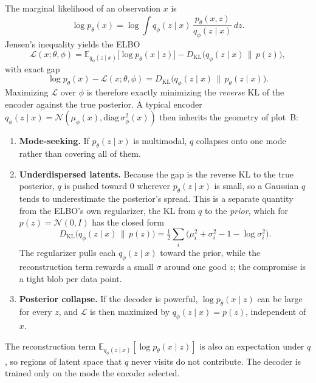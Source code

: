 \documentclass[11pt]{article}
\newcommand{\KL}{D_{\mathrm{KL}}}
\newcommand{\E}{\mathbb{E}}
\begin{document}
The marginal likelihood of an observation \(x\) is
\[
  \log p_\theta(x)
  =\log\int q_\phi(z\mid x)\,\frac{p_\theta(x,z)}{q_\phi(z\mid x)}\,dz.
\]
Jensen's inequality yields the ELBO
\begin{equation}
  \mathcal{L}(x;\theta,\phi)
  =\E_{q_\phi(z\mid x)}\bigl[\log p_\theta(x\mid z)\bigr]
  -\KL\bigl(q_\phi(z\mid x)\,\|\,p(z)\bigr),
\end{equation}
with exact gap
\begin{equation}
  \log p_\theta(x)-\mathcal{L}(x;\theta,\phi)
  =\KL\bigl(q_\phi(z\mid x)\,\|\,p_\theta(z\mid x)\bigr).
\end{equation}
Maximizing \(\mathcal{L}\) over \(\phi\) is therefore exactly minimizing
the \emph{reverse} KL of the encoder against the true posterior. A
typical encoder \(q_\phi(z\mid x)=\mathcal{N}(\mu_\phi(x),\mathrm{diag}\,\sigma_\phi^2(x))\)
then inherits the geometry of plot~B:
\begin{enumerate}
  \item \textbf{Mode-seeking.} If \(p_\theta(z\mid x)\) is multimodal,
    \(q\) collapses onto one mode rather than covering all of them.
  \item \textbf{Underdispersed latents.} Because the gap is the reverse
    KL to the true posterior, \(q\) is pushed toward \(0\) wherever
    \(p_\theta(z\mid x)\) is small, so a Gaussian \(q\) tends to
    underestimate the posterior's spread. This is a separate quantity
    from the ELBO's own regularizer, the KL from \(q\) to the
    \emph{prior}, which for \(p(z)=\mathcal{N}(0,I)\) has the closed form
    \[
      \KL\bigl(q_\phi(z\mid x)\,\|\,p(z)\bigr)
      =\tfrac12\sum_i\bigl(\mu_i^2+\sigma_i^2-1-\log\sigma_i^2\bigr).
    \]
    The regularizer pulls each \(q_\phi(z\mid x)\) toward the prior, while
    the reconstruction term rewards a small \(\sigma\) around one good
    \(z\); the compromise is a tight blob per data point.
  \item \textbf{Posterior collapse.} If the decoder is powerful,
    \(\log p_\theta(x\mid z)\) can be large for every \(z\), and
    \(\mathcal{L}\) is then maximized by \(q_\phi(z\mid x)=p(z)\),
    independent of \(x\).
\end{enumerate}
The reconstruction term
\(\E_{q_\phi(z\mid x)}[\log p_\theta(x\mid z)]\) is also an expectation
under \(q\), so regions of latent space that \(q\) never visits do not
contribute. The decoder is trained only on the mode the encoder
selected.

\end{document}
